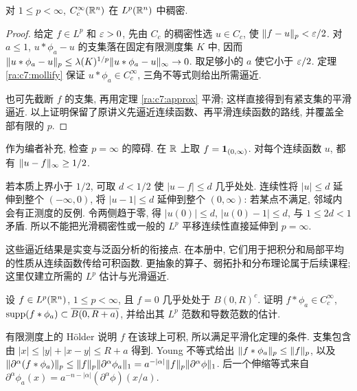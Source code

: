 \begin{theorem}[光滑紧支集函数稠密]\label{ra:c7:density}
对 $1\le p<\infty$, $C_c^\infty(\mathbb R^n)$ 在 $L^p(\mathbb R^n)$ 中稠密.
\end{theorem}
\begin{proof}
给定 $f\in L^p$ 和 $\varepsilon>0$, 先由 $C_c$ 的稠密性选 $u\in C_c$, 使 $\lVert f-u\rVert_p<\varepsilon/2$. 对 $a\le1$, $u*\phi_a-u$ 的支集落在固定有限测度集 $K$ 中, 因而
$\lVert u*\phi_a-u\rVert_p\le\lambda(K)^{1/p}\lVert u*\phi_a-u\rVert_\infty\to0$.
取足够小的 $a$ 使它小于 $\varepsilon/2$. 定理 \ref{ra:c7:mollify} 保证 $u*\phi_a\in C_c^\infty$, 三角不等式则给出所需逼近.

也可先截断 $f$ 的支集, 再用定理 \ref{ra:c7:approx} 平滑; 这样直接得到有紧支集的平滑逼近. 以上证明保留了原讲义先逼近连续函数、再平滑连续函数的路线, 并覆盖全部有限的 $p$.
\end{proof}

\begin{example}
作为编者补充, 检查 $p=\infty$ 的障碍. 在 $\mathbb R$ 上取 $f=\mathbf 1_{(0,\infty)}$. 对每个连续函数 $u$, 都有 $\lVert u-f\rVert_\infty\ge1/2$.
\end{example}
\begin{solution}
若本质上界小于 $1/2$, 可取 $d<1/2$ 使 $|u-f|\le d$ 几乎处处. 连续性将 $|u|\le d$ 延伸到整个 $(-\infty,0)$, 将 $|u-1|\le d$ 延伸到整个 $(0,\infty)$: 若某点不满足, 邻域内会有正测度的反例. 令两侧趋于零, 得 $|u(0)|\le d$, $|u(0)-1|\le d$, 与 $1\le2d<1$ 矛盾. 所以不能把光滑稠密性或一般的 $L^p$ 平移连续性直接延伸到 $p=\infty$.
\end{solution}

这些逼近结果是实变与泛函分析的衔接点. 在本册中, 它们用于把积分和局部平均的性质从连续函数传给可积函数. 更抽象的算子、弱拓扑和分布理论属于后续课程; 这里仅建立所需的 $L^p$ 估计与光滑逼近.


\begin{exercise}
设 $f\in L^p(\mathbb R^n)$, $1\le p<\infty$, 且 $f=0$ 几乎处处于 $B(0,R)^c$. 证明 $f*\phi_a\in C_c^\infty$, $\operatorname{supp}(f*\phi_a)\subset\overline{B(0,R+a)}$, 并给出其 $L^p$ 范数和导数范数的估计.
\end{exercise}
\begin{solution}
有限测度上的 Hölder 说明 $f$ 在该球上可积, 所以满足平滑化定理的条件. 支集包含由 $|x|\le|y|+|x-y|\le R+a$ 得到. Young 不等式给出 $\lVert f*\phi_a\rVert_p\le\lVert f\rVert_p$, 以及
$\lVert \partial^\alpha(f*\phi_a)\rVert_p
\le\lVert f\rVert_p\lVert \partial^\alpha\phi_a\rVert_1
=a^{-|\alpha|}\lVert f\rVert_p\lVert \partial^\alpha\phi\rVert_1$.
后一个伸缩等式来自 $\partial^\alpha\phi_a(x)=a^{-n-|\alpha|}(\partial^\alpha\phi)(x/a)$.
\end{solution}

